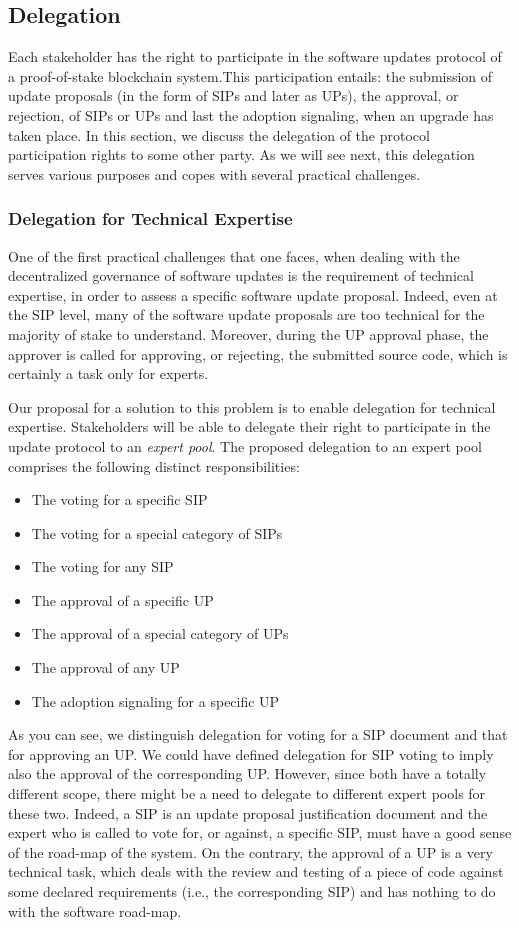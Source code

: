 \subsection{Delegation}
Each stakeholder has the right to participate in the software updates protocol of a proof-of-stake blockchain system.This participation entails: the submission of update proposals (in the form of SIPs and later as UPs), the approval, or rejection, of SIPs or UPs and last the adoption signaling, when an upgrade has taken place. In this section, we discuss the delegation of the protocol participation rights to some other party. As we will see next, this delegation serves various purposes and copes with several practical challenges.
\subsubsection{Delegation for Technical Expertise}\label{delfortech}
One of the first practical challenges that one faces, when dealing with the decentralized governance of software updates is the requirement of technical expertise, in order to assess a specific software update proposal. Indeed, even at the SIP level, many of the software update proposals are too technical for the majority of stake to understand. Moreover, during the UP approval phase, the approver is called for approving, or rejecting, the submitted source code, which is certainly a task only for experts.

Our proposal for a solution to this problem is to enable delegation for technical expertise. Stakeholders will be able to delegate their right to participate in the update protocol to an \emph{expert pool}. The proposed delegation to an expert pool comprises the following distinct responsibilities:
\begin{itemize}
\item The voting for a specific SIP
\item The voting for a special category of SIPs 
\item The voting for any SIP
\item The approval of a specific UP
\item The approval of a special category of UPs
\item The approval of any UP
\item The adoption signaling for a specific UP
\end{itemize}
As you can see, we distinguish delegation for voting for a SIP document and that for approving an UP. We could have defined delegation for SIP voting to imply also the approval of the corresponding UP. However, since both have a totally different scope, there might be a need to delegate to different expert pools for these two. Indeed, a SIP is an update proposal justification document and the expert who is called to vote for, or against, a specific SIP, must have a good sense of the road-map of the system. On the contrary, the approval of a UP is a very technical task, which deals with the review and testing of a piece of code against some declared requirements (i.e., the corresponding SIP) and has nothing to do with the software road-map.

